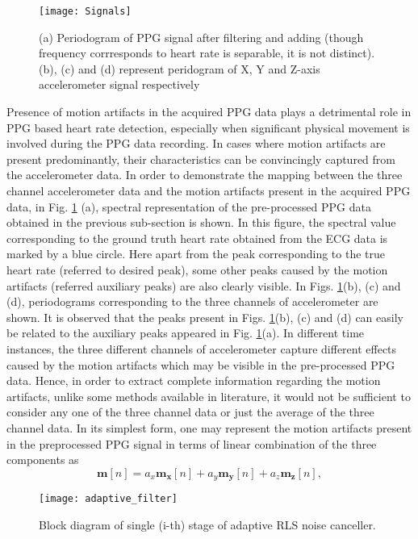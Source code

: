 \documentclass[final,3p,times,authoryear]{elsarticle}
\begin{document}
\begin{figure}[h]
	\centering
	\texttt{[image: Signals]}\\
  \caption{(a) Periodogram of PPG signal after filtering and adding (though frequency corrresponds to heart rate is separable, it is not distinct). (b), (c) and (d) represent peridogram of X, Y and Z-axis accelerometer signal respectively}\label{Fig:signal}
\end{figure}
 
Presence of motion artifacts in the acquired PPG data plays a detrimental role in PPG based heart rate detection, especially when significant physical movement is involved during the PPG data recording. In cases where motion artifacts are present predominantly, their characteristics can be convincingly captured from the accelerometer data. In order to demonstrate the mapping between the three channel accelerometer data and the motion artifacts present in the acquired PPG data, in Fig. \ref{Fig:signal} (a), spectral representation of the pre-processed PPG data obtained in the previous sub-section is shown. In this figure, the spectral value corresponding to the ground truth heart rate obtained from the ECG data is marked by a blue circle. Here apart from the peak corresponding to the true heart rate (referred to desired peak), some other peaks caused by the motion artifacts (referred auxiliary peaks) are also clearly visible. In Figs. \ref{Fig:signal}(b), (c) and (d), periodograms corresponding to the three channels of accelerometer are shown. It is observed that the peaks present in Figs. \ref{Fig:signal}(b), (c) and (d) can easily be related to the auxiliary peaks appeared in Fig. \ref{Fig:signal}(a). In different time instances, the three different channels of accelerometer capture different effects caused by the motion artifacts which may be visible in the pre-processed PPG data. Hence, in order to extract complete information regarding the motion artifacts, unlike some methods available in literature, it would not be sufficient to consider any one of the three channel data or just the average of the three channel data. In its simplest form, one may represent the motion artifacts present in the preprocessed PPG signal in terms of linear combination of the three components as
\begin{equation}
\boldsymbol{m}[n] = a_x\boldsymbol{m_x}[n] + a_y\boldsymbol{m_y}[n] + a_z\boldsymbol{m_z}[n],
\end{equation}

\begin{figure}[h]
  \centering
  \texttt{[image: adaptive\_filter]}\\
  \caption{Block diagram of single (i-th) stage of adaptive RLS noise canceller. }\label{Fig:afbd}
\end{figure}
\end{document}
